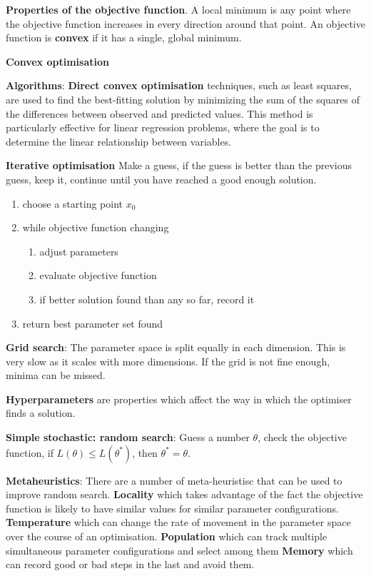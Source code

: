 \documentclass{article}
\begin{document}
\textbf{Properties of the objective function}. A local minimum is any point where the objective function
increases in every direction around that point. An objective function is \textbf{convex} if it has a single, global minimum.

\textbf{Convex optimisation}

\textbf{Algorithms}:
\textbf{Direct convex optimisation} techniques, such as least squares,
are used to find the best-fitting solution by minimizing the sum of the squares of the differences
between observed and predicted values. This method is particularly effective for linear regression
problems, where the goal is to determine the linear relationship between variables.

\textbf{Iterative optimisation}
Make a guess, if the guess is better than the previous guess, keep it, continue until you have reached a good enough solution.
\begin{enumerate}
    \item choose a starting point $x_0$
    \item while objective function changing
    \begin{enumerate}
        \item adjust parameters
        \item evaluate objective function
        \item if better solution found than any so far, record it
    \end{enumerate}
    \item return best parameter set found
\end{enumerate}

\textbf{Grid search}: The parameter space is split equally in each dimension.
This is very slow as it scales with more dimensions.
If the grid is not fine enough, minima can be missed.

\textbf{Hyperparameters} are properties which affect the way in which the optimiser finds a solution.

\textbf{Simple stochastic: random search}: Guess a number $\theta$, check the objective function,
if $L(\theta) \le L(\theta^*)$, then $\theta^* = \theta$.

\textbf{Metaheuristics}:
There are a number of meta-heuristisc that can be used to improve random search.
\textbf{Locality} which takes advantage of the fact the objective function is likely to have similar values for similar parameter configurations.
\textbf{Temperature} which can change the rate of movement in the parameter space over the course of an optimisation.
\textbf{Population} which can track multiple simultaneous parameter configurations and select among them
\textbf{Memory} which can record good or bad steps in the last and avoid them.
\end{document}
